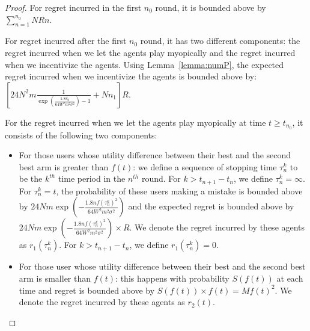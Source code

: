 \documentclass[twoside,11pt]{article}
\begin{document}
\begin{proof}
For regret incurred in the first $n_0$ round, it is bounded above by $\sum_{n=1}^{n_{0}}NRn$.

For regret incurred after the first $n_0$ round, it has two different components: the regret incurred when we let the agents play myopically and the regret incurred when we incentivize the agents. Using Lemma~\ref{lemma:numP}, the expected regret incurred when we incentivize the agents is bounded above by: $\left[24N^2 m \frac{1}{\exp(\frac{1.8\delta_{0}}{64W^2 m^2\sigma^2})-1} + Nn_1\right]R$.

For the regret incurred when we let the agents play myopically at time $t\geq t_{n_0}$, it consists of the following two components:
\begin{itemize}
\item For those users whose utility difference between their best and the second best arm is greater than $f(t)$: we define a sequence of stopping time $\tau_{n}^{k}$ to be the $k^{th}$ time period in the $n^{th}$ round. For $k>t_{n+1}-t_{n}$, we define $\tau_{n}^{k}=\infty$. For $\tau_{n}^{k}=t$, the probability of these users making a mistake is bounded above by $24Nm\exp\left(-\frac{1.8n f(\tau_{n}^{k})^2}{64 W^2 m^2\sigma^2}\right)$ and the expected regret is bounded above by $24Nm\exp\left(-\frac{1.8n f(\tau_{n}^{k})^2}{64 W^2 m^2\sigma^2}\right)\times R$. We denote the regret incurred by these agents as $r_1(\tau_{n}^{k})$. For $k>t_{n+1}-t_{n}$, we define $r_1(\tau_{n}^{k})=0$.
\item For those user whose utility difference between their best and the second best arm is smaller than $f(t)$: this happens with probability $S(f(t))$ at each time and regret is bounded above by $S(f(t)) \times f(t)=Mf(t)^2$. We denote the regret incurred by these agents as $r_2(t)$.
\end{itemize}


\end{proof}
\end{document}

